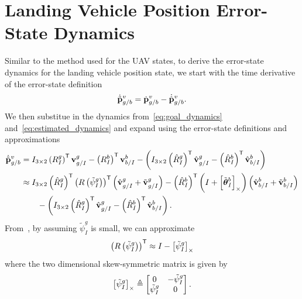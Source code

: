 \section{Landing Vehicle Position Error-State Dynamics}
Similar to the method used for the UAV states, to derive the error-state
dynamics for the landing vehicle position state, we start with the time
derivative of the error-state definition
\begin{equation}
  \dot{\tilde{\boldsymbol{\mathrm{p}}}}_{g/b}^{v} = \dot{\boldsymbol{\mathrm{p}}}_{g/b}^{v} -
  \dot{\hat{\boldsymbol{\mathrm{p}}}}_{g/b}^{v}.
\end{equation}
We then substitue in the dynamics from~\eqref{eq:goal_dynamics}
and~\eqref{eq:estimated_dynamics} and expand using the error-state definitions
and approximations
\begin{align}
  \dot{\tilde{\boldsymbol{\mathrm{p}}}}_{g/b}^{v}
  &=
  I_{3 \times 2} \left( R_{I}^{g} \right)^{\mathsf{T}}
  \boldsymbol{\mathrm{v}}_{g/I}^{g} - \left( R_{I}^{b} \right)^{\mathsf{T}}
  \boldsymbol{\mathrm{v}}_{b/I}^{b}
  -
  \left(
  I_{3 \times 2} \left( \hat{R}_{I}^{g} \right)^{\mathsf{T}}
  \hat{\boldsymbol{\mathrm{v}}}_{g/I}^{g} - \left( \hat{R}_{I}^{b} \right)^{\mathsf{T}}
  \hat{\boldsymbol{\mathrm{v}}}_{b/I}^{b}
  \right) \\
  &\approx
  \label{eq:goal_pos_err_state1}
  I_{3 \times 2} \left( \hat{R}_{I}^{g} \right)^{\mathsf{T}}
  \left( R \left( \tilde{\psi}_{I}^{g} \right) \right)^{\mathsf{T}}
  \left( \hat{\boldsymbol{\mathrm{v}}}_{g/I}^{g} + \tilde{\boldsymbol{\mathrm{v}}}_{g/I}^{g} \right) - \left(
  \hat{R}_{I}^{b} \right)^{\mathsf{T}}
  \left( I + \left[ \tilde{\boldsymbol{\mathrm{\theta}}}_I^b \right]_{\times} \right)
  \left( \hat{\boldsymbol{\mathrm{v}}}_{b/I}^{b} + \tilde{\boldsymbol{\mathrm{v}}}_{b/I}^{b} \right) \\
  & \qquad -
  \left(
  I_{3 \times 2} \left( \hat{R}_{I}^{g} \right)^{\mathsf{T}}
  \hat{\boldsymbol{\mathrm{v}}}_{g/I}^{g} - \left( \hat{R}_{I}^{b} \right)^{\mathsf{T}}
  \hat{\boldsymbol{\mathrm{v}}}_{b/I}^{b}
  \right). \nonumber
\end{align}
From~\cite{sola2018micro}, by assuming $\tilde{\psi}_I^g$ is small, we can approximate 
\begin{equation}
  \left( R \left( \tilde{\psi}_I^g \right) \right)^{\mathsf{T}} \approx I -
  \left[ \tilde{\psi}_I^g \right]_{\times}
  \label{eq:2d_err_rot_approx}
\end{equation}
where the two dimensional skew-symmetric matrix is given by
\begin{equation}
  \left[ \tilde{\psi}_I^g \right]_{\times} \triangleq
  \begin{bmatrix}
    0 & -\tilde{\psi}_I^g \\
    \tilde{\psi}_I^g & 0
  \end{bmatrix}.
\end{equation}
